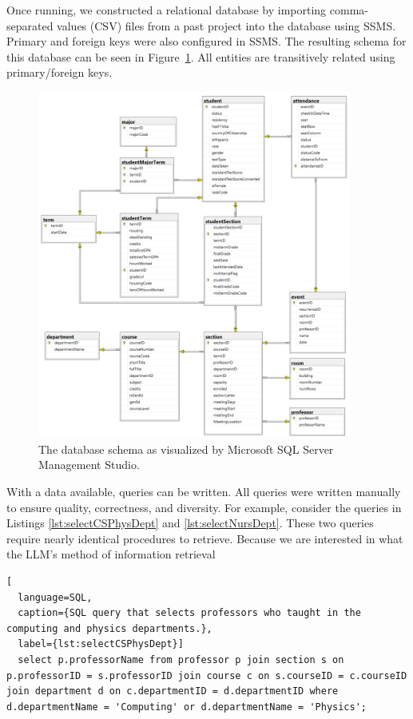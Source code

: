 Once running, we constructed a relational database by importing comma-separated values (CSV) files from a past project \cite{hybl2023} into the database using SSMS. Primary and foreign keys were also configured in SSMS. The resulting schema for this database can be seen in Figure~\ref{fig:schema}. All entities are transitively related using primary/foreign keys.
\begin{figure}[ht]
  \centering
  \includegraphics[width=0.92\textwidth]{figures/attendanceDBSchema.png}
  \caption{The database schema as visualized by Microsoft SQL Server Management Studio.}
  \label{fig:schema}
\end{figure}

With a data available, queries can be written. All queries were written manually to ensure quality, correctness, and diversity. For example, consider the queries in Listings \ref{lst:selectCSPhysDept} and \ref{lst:selectNursDept}. These two queries require nearly identical procedures to retrieve. Because we are interested in what the LLM's method of information retrieval

\begin{lstlisting}[
  language=SQL,
  caption={SQL query that selects professors who taught in the computing and physics departments.},
  label={lst:selectCSPhysDept}]
  select p.professorName from professor p join section s on p.professorID = s.professorID join course c on s.courseID = c.courseID join department d on c.departmentID = d.departmentID where d.departmentName = 'Computing' or d.departmentName = 'Physics';
\end{lstlisting}

